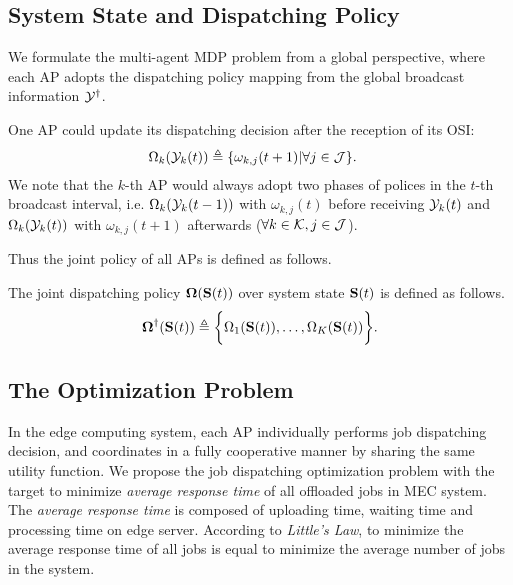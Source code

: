 \subsection{System State and Dispatching Policy}
We formulate the multi-agent MDP problem from a global perspective, where each AP adopts the dispatching policy mapping from the global broadcast information $\mathcal{Y}^{\dagger}$.
\begin{definition}
    One AP could update its dispatching decision after the reception of its OSI:
    \begin{align}
        &\Omega_{k}(\mathcal{Y}_{k}(t)) \triangleq \{\omega_{k,j}(t+1)|\forall j\in\mathcal{J}\}.
        \label{def_action}
    \end{align}
    We note that the $k$-th AP would always adopt two phases of polices in the $t$-th broadcast interval, i.e. $\Omega_{k}(\mathcal{Y}_{k}(t-1))$ with $\omega_{k,j}(t)$ before receiving $\mathcal{Y}_{k}(t)$ and $\Omega_{k}(\mathcal{Y}_{k}(t))$ with $\omega_{k,j}(t+1)$ afterwards ($\forall k\in\mathcal{K}, j\in\mathcal{J}$).
\end{definition}

Thus the joint policy of all APs is defined as follows.
\begin{definition}
    The joint dispatching policy $\boldsymbol{\Omega}(\mathbf{S}(t))$ over system state $\mathbf{S}(t)$ is defined as follows.
    \begin{align}
        \boldsymbol{\Omega}^{\dagger}(\mathbf{S}(t)) \triangleq \bigg\{
            \Omega_{1}(\mathbf{S}(t)), \dots, \Omega_{K}(\mathbf{S}(t))
        \bigg\}.
    \end{align}
\end{definition}

\subsection{The Optimization Problem}
In the edge computing system, each AP individually performs job dispatching decision, and coordinates in a fully cooperative manner by sharing the same utility function.
We propose the job dispatching optimization problem with the target to minimize \emph{average response time} of all offloaded jobs in MEC system.
The \emph{average response time} is composed of uploading time, waiting time and processing time on edge server.
According to \emph{Little's Law}, to minimize the average response time of all jobs is equal to minimize the average number of jobs in the system.

